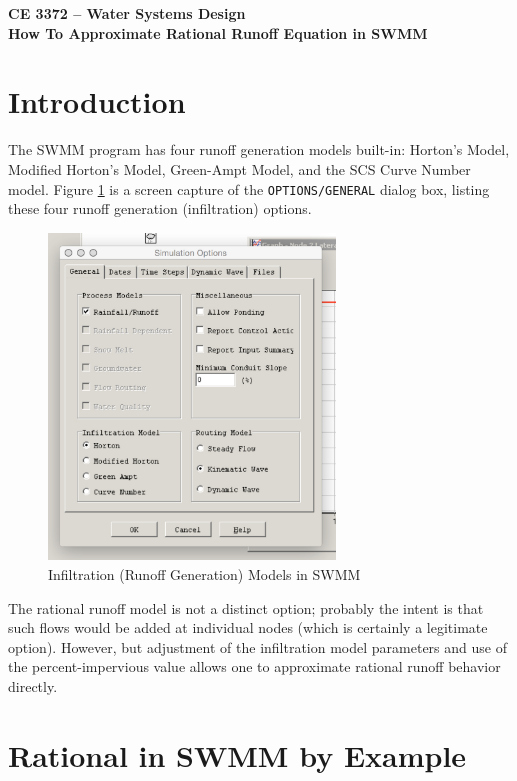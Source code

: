 \documentclass[12pt]{article}
\begin{document}
\begin{center}
{\textbf{{ CE 3372 -- Water Systems Design} \\ {How To Approximate Rational Runoff Equation in SWMM}}}
\end{center}

\section*{\small{Introduction}} 
The SWMM program has four runoff generation models built-in:  Horton's Model, Modified Horton's Model, Green-Ampt Model, and the SCS Curve Number model. 
Figure \ref{fig:SWMMHydrologyModels} is a screen capture of the \texttt{OPTIONS/GENERAL} dialog box, listing these four runoff generation (infiltration) options.

\begin{figure}[h!] %
   \centering
   \includegraphics[width=3in]{SWMMHydrologyModels.jpg} 
   \caption{Infiltration (Runoff Generation) Models in SWMM}
   \label{fig:SWMMHydrologyModels}
\end{figure}

The rational runoff model is not a distinct option; probably the intent is that such flows would be added at individual nodes (which is certainly a legitimate option).
However, but adjustment of the infiltration model parameters and use of the percent-impervious value allows one to approximate rational runoff behavior directly.

\section*{\small{Rational in SWMM by Example}}
\end{document}
